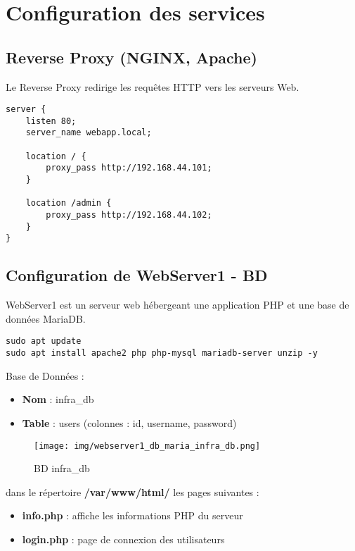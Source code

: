 \documentclass[a4paper,12pt]{report}
\begin{document}
\section{Configuration des services}
\subsection{Reverse Proxy (NGINX, Apache)}
Le Reverse Proxy redirige les requêtes HTTP vers les serveurs Web.

\begin{lstlisting}
server {
    listen 80;
    server_name webapp.local;
    
    location / {
        proxy_pass http://192.168.44.101;
    }
    
    location /admin {
        proxy_pass http://192.168.44.102;
    }
}
\end{lstlisting}

\subsection{Configuration de WebServer1 - BD}
WebServer1 est un serveur web hébergeant une application PHP et une base de données MariaDB.

\begin{lstlisting}
sudo apt update
sudo apt install apache2 php php-mysql mariadb-server unzip -y
\end{lstlisting}

Base de Données : 

\begin{itemize}
    \item \textbf{Nom} : infra\_db
    \item \textbf{Table} : users (colonnes : id, username, password)
\end{itemize}

\begin{figure}[H] 
\label{web1-bd}
    \centering
    \texttt{[image: img/webserver1\_db\_maria\_infra\_db.png]} 
    \caption{BD infra\_db}
\end{figure}

dans le répertoire \textbf{/var/www/html/} les pages suivantes :

\begin{itemize}
    \item \textbf{info.php} : affiche les informations PHP du serveur
    \item \textbf{login.php} : page de connexion des utilisateurs
\end{itemize}
\end{document}
